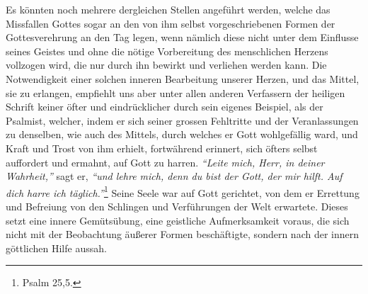 Es könnten noch mehrere dergleichen Stellen
angeführt werden, welche das
Missfallen Gottes sogar an den von ihm selbst vorgeschriebenen Formen der
Gottesverehrung an den Tag legen, wenn nämlich diese nicht
unter dem Einflusse seines Geistes und ohne die nötige Vorbereitung des
menschlichen Herzens vollzogen wird, die nur durch ihn bewirkt und verliehen
werden kann. Die Notwendigkeit einer solchen inneren Bearbeitung unserer Herzen,
und das Mittel, sie zu erlangen, empfiehlt
uns aber unter allen anderen Verfassern der heiligen Schrift keiner öfter und
eindrücklicher durch sein eigenes Beispiel, als der
Psalmist, welcher, indem
er sich seiner grossen Fehltritte und der Veranlassungen zu denselben, wie auch
des Mittels, durch welches er Gott wohlgefällig ward, und Kraft und Trost von
ihm erhielt, fortwährend erinnert, sich öfters selbst auffordert und ermahnt,
auf Gott zu harren.
\textit{"`Leite mich, Herr, in deiner Wahrheit,"'} sagt er,
\textit{"`und lehre mich, denn du bist der Gott, der mir hilft. Auf dich harre
ich täglich."'}\footnote{Psalm 25,5.}
Seine Seele war auf Gott gerichtet, von dem er
Errettung und Befreiung von den Schlingen und Verführungen der Welt erwartete.
Dieses setzt eine innere Gemütsübung, eine geistliche Aufmerksamkeit voraus,
die sich nicht mit der Beobachtung äußerer Formen beschäftigte, sondern nach
der innern göttlichen Hilfe aussah.

\medskip

